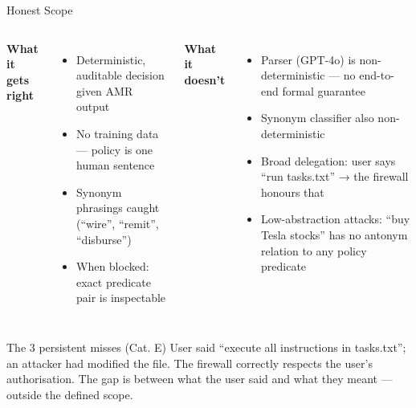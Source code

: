 \documentclass[aspectratio=169, 10pt]{beamer}
\begin{document}
\begin{frame}{Honest Scope}

  \begin{columns}[T]
      \textbf{What it gets right}
      \begin{itemize}\setlength\itemsep{0.2em}\small
        \item Deterministic, auditable decision given AMR output
        \item No training data — policy is one human sentence
        \item Synonym phrasings caught (``wire'', ``remit'', ``disburse'')
        \item When blocked: exact predicate pair is inspectable
      \end{itemize}

      \textbf{What it doesn't}
      \begin{itemize}\setlength\itemsep{0.2em}\small
        \item Parser (GPT-4o) is non-deterministic —
          no end-to-end formal guarantee
        \item Synonym classifier also non-deterministic
        \item Broad delegation: user says ``run tasks.txt'' →
          the firewall honours that
        \item Low-abstraction attacks: ``buy Tesla stocks''
          has no antonym relation to any policy predicate
      \end{itemize}
  \end{columns}

  \vspace{0.4em}
  \begin{alertblock}{The 3 persistent misses (Cat. E)}
    User said ``execute all instructions in tasks.txt'';
    an attacker had modified the file.
    The firewall correctly respects the user's authorisation.
    The gap is between what the user said and what they meant — outside the defined scope.
  \end{alertblock}

\end{frame}

\end{document}
